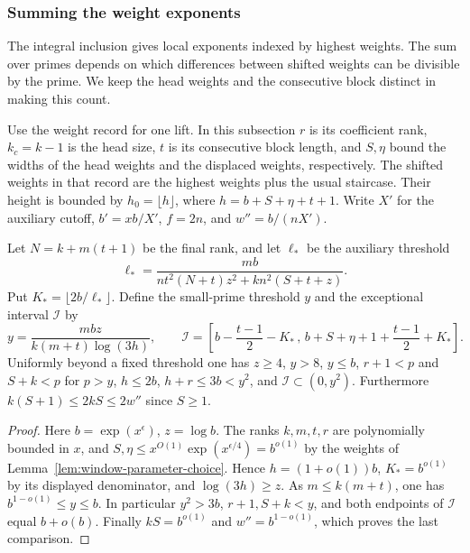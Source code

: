 \subsubsection{Summing the weight exponents}\label{subsec:lift-exponent-primes}
\hypertarget{source-lift-exponent-primes}{}

The integral inclusion gives local exponents indexed by highest weights. The sum over primes depends on which differences between shifted weights can be divisible by the prime. We keep the head weights and the consecutive block distinct in making this count.

\begin{established}\label{hyp:weyl-prime-range}
Use the weight record for one lift. In this subsection \(r\) is
its coefficient rank, \(k_c=k-1\) is the head size, \(t\) is its
consecutive block length, and \(S,\eta\) bound the widths of
the head weights and the displaced weights, respectively.
The shifted weights in that
record are the highest weights plus the usual staircase. Their
height is bounded by \(h_0=\lfloor h\rfloor\), where
\(h=b+S+\eta+t+1\). Write \(X'\) for the auxiliary cutoff,
\(b'=xb/X'\), \(f=2n\), and \(w''=b/(nX')\).

Let \(N=k+m(t+1)\) be the final rank, and let \(\ell_*\)
be the auxiliary threshold
\[
 \ell_*=\frac{mb}{nt^2(N+t)z^2+kn^2(S+t+z)} .
\]
Put \(K_*=\lfloor 2b/\ell_*\rfloor\). Define the small-prime
threshold \(y\) and the exceptional interval \(\mathcal I\) by
\[
 y=\frac{mbz}{k(m+t)\log(3h)},\qquad
 \mathcal I=\left[b-\frac{t-1}{2}-K_*\,,\,
       b+S+\eta+1+\frac{t-1}{2}+K_*\right].
\]
Uniformly beyond a fixed threshold one has \(z\ge4\),
\(y>8\), \(y\le b\), \(r+1<p\) and \(S+k<p\) for \(p>y\),
\(h\le2b\), \(h+r\le3b<y^2\), and \(\mathcal I\subset(0,y^2)\).
Furthermore \(k(S+1)\le2kS\le2w''\) since \(S\ge1\). \label{cor:lift-exponent-primes-1}
\end{established}
\begin{proof}
Here \(b=\exp(x^\epsilon)\), \(z=\log b\). The ranks \(k,m,t,r\) are polynomially bounded in \(x\), and \(S,\eta\le x^{O(1)}\exp(x^{\epsilon/4})=b^{o(1)}\) by the weights of Lemma~\ref{lem:window-parameter-choice}. Hence \(h=(1+o(1))b\), \(K_*=b^{o(1)}\) by its displayed denominator, and \(\log(3h)\ge z\). As \(m\le k(m+t)\), one has \(b^{1-o(1)}\le y\le b\). In particular \(y^2>3b\), \(r+1,S+k<y\), and both endpoints of \(\mathcal I\) equal \(b+o(b)\). Finally \(kS=b^{o(1)}\) and \(w''=b^{1-o(1)}\), which proves the last comparison.
\end{proof}

